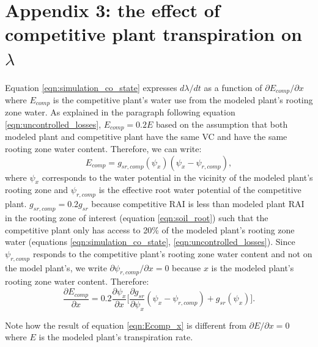 \documentclass[utf8]{frontiersSCNS} %
\begin{document}
\section*{Appendix 3: the effect of competitive plant transpiration on $\lambda$}
Equation \ref{eqn:simulation_co_state} expresses $d \lambda / dt$ as a function of $\partial E_{comp} / \partial x$ where $E_{comp}$ is the competitive plant's water use from the modeled plant's rooting zone water. As explained in the paragraph following equation \ref{eqn:uncontrolled_losses}, $E_{comp}=0.2E$ based on the assumption that both modeled plant and competitive plant have the same VC and have the same rooting zone water content. Therefore, we can write:
\begin{equation}
    \label{eqn:E_comp}
    E_{comp} = g_{sr,comp}(\psi_x)(\psi_x - \psi_{r,comp}),
\end{equation}
where $\psi_x$ corresponds to the water potential in the vicinity of the modeled plant's rooting zone and $\psi_{r,comp}$ is the effective root water potential of the competitive plant. $g_{sr,comp} = 0.2 g_{sr}$ because competitive RAI is less than modeled plant RAI in the rooting zone of interest (equation \ref{eqn:soil_root}) such that the competitive plant only has access to 20\% of the modeled plant's rooting zone water (equations \ref{eqn:simulation_co_state}, \ref{eqn:uncontrolled_losses}). Since $\psi_{r,comp}$ responds to the competitive plant's rooting zone water content and not on the model plant's, we write $\partial \psi_{r,comp} / \partial x = 0$ because $x$ is the modeled plant's rooting zone water content. Therefore:
\begin{equation}
    \label{eqn:Ecomp_x}
    \frac{\partial E_{comp}}{\partial x} = 0.2 \frac{\partial \psi_x}{\partial x} \Bigg[ \frac{\partial g_{sr}}{\partial \psi_x} (\psi_x - \psi_{r,comp}) + g_{sr}(\psi_x) \Bigg].
\end{equation}

Note how the result of equation \ref{eqn:Ecomp_x} is different from $\partial E / \partial x = 0$ where $E$ is the modeled plant's transpiration rate.



\end{document}
